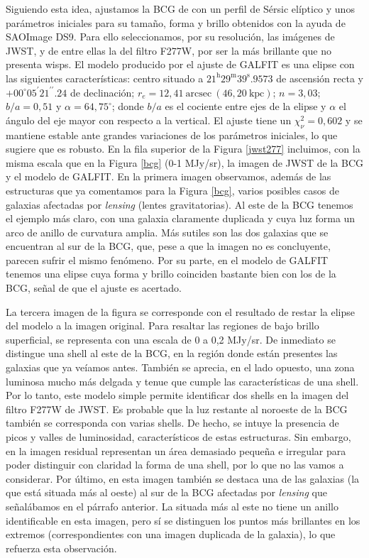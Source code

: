Siguiendo esta idea, ajustamos la BCG de \clust{} con un perfil de Sérsic elíptico y unos parámetros iniciales para su tamaño, forma y brillo obtenidos con la ayuda de SAOImage DS9. Para ello seleccionamos, por su resolución, las imágenes de JWST, y de entre ellas la del filtro F277W, por ser la más brillante que no presenta wisps. El modelo producido por el ajuste de GALFIT es una elipse con las siguientes características: centro situado a \(21^{\text{h}}29^{\text{m}}39^{\text{s}}.9573\) de ascensión recta y \(+00^{\circ} 05^{\prime}21^{\prime\prime}.24\) de declinación; \(r_e = 12,41 \: \text{arcsec} \: (46,20 \: \text{kpc})\); \(n = 3,03\); \(b/a = 0,51\) y \(\alpha = 64,75^{\circ}\); donde \(b/a\) es el cociente entre ejes de la elipse y \(\alpha\) el ángulo del eje mayor con respecto a la vertical. El ajuste tiene un \(\chi^{2}_{\nu} = 0,602\) y se mantiene estable ante grandes variaciones de los parámetros iniciales, lo que sugiere que es robusto. En la fila superior de la Figura \ref{jwst277} incluimos, con la misma escala que en la Figura \ref{bcg} (0-1 MJy/sr), la imagen de JWST de la BCG y el modelo de GALFIT. En la primera imagen observamos, además de las estructuras que ya comentamos para la Figura \ref{bcg}, varios posibles casos de galaxias afectadas por \textit{lensing} (lentes gravitatorias). Al este de la BCG tenemos el ejemplo más claro, con una galaxia claramente duplicada y cuya luz forma un arco de anillo de curvatura amplia. Más sutiles son las dos galaxias que se encuentran al sur de la BCG, que, pese a que la imagen no es concluyente, parecen sufrir el mismo fenómeno. Por su parte, en el modelo de GALFIT tenemos una elipse cuya forma y brillo coinciden bastante bien con los de la BCG, señal de que el ajuste es acertado. \par 

La tercera imagen de la figura se corresponde con el resultado de restar la elipse del modelo a la imagen original. Para resaltar las regiones de bajo brillo superficial, se representa con una escala de 0 a 0,2 MJy/sr. De inmediato se distingue una shell al este de la BCG, en la región donde están presentes las galaxias que ya veíamos antes. También se aprecia, en el lado opuesto, una zona luminosa mucho más delgada y tenue que cumple las características de una shell. Por lo tanto, este modelo simple permite identificar dos shells en la imagen del filtro F277W de JWST. Es probable que la luz restante al noroeste de la BCG también se corresponda con varias shells. De hecho, se intuye la presencia de picos y valles de luminosidad, característicos de estas estructuras. Sin embargo, en la imagen residual representan un área demasiado pequeña e irregular para poder distinguir con claridad la forma de una shell, por lo que no las vamos a considerar. Por último, en esta imagen también se destaca una de las galaxias (la que está situada más al oeste) al sur de la BCG afectadas por \textit{lensing} que señalábamos en el párrafo anterior. La situada más al este no tiene un anillo identificable en esta imagen, pero sí se distinguen los puntos más brillantes en los extremos (correspondientes con una imagen duplicada de la galaxia), lo que refuerza esta observación. \par



